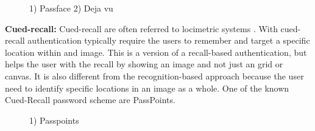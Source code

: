         \begin{figure}[H]
          \centering
          \caption{1) Passface 2) Deja vu}
        \end{figure}

      {\bf Cued-recall:} Cued-recall are often referred to locimetric systems \cite{DeAngeli}. With cued-recall authentication typically require the users to remember and target a specific location within and image. This is a version of a recall-based authentication, but helps the user with the recall by showing an image and not just an grid or canvas. It is also different from the recognition-based approach because the user need to identify specific locations in an image as a whole. One of the known Cued-Recall password scheme are PassPoints.

        \begin{figure}[H]
          \centering
          \caption{1) Passpoints}
        \end{figure}

